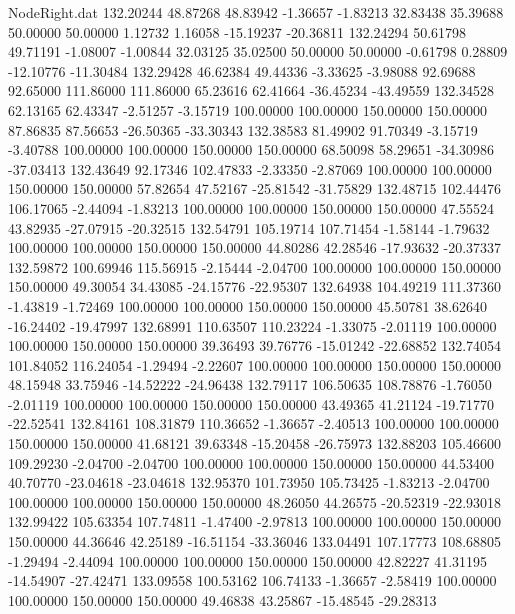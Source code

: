 \begin{filecontents}{NodeRight.dat}
 132.20244   48.87268   48.83942    -1.36657   -1.83213   32.83438   35.39688   50.00000   50.00000    1.12732    1.16058  -15.19237  -20.36811
 132.24294   50.61798   49.71191    -1.08007   -1.00844   32.03125   35.02500   50.00000   50.00000   -0.61798    0.28809  -12.10776  -11.30484
 132.29428   46.62384   49.44336    -3.33625   -3.98088   92.69688   92.65000  111.86000  111.86000   65.23616   62.41664  -36.45234  -43.49559
 132.34528   62.13165   62.43347    -2.51257   -3.15719  100.00000  100.00000  150.00000  150.00000   87.86835   87.56653  -26.50365  -33.30343
 132.38583   81.49902   91.70349    -3.15719   -3.40788  100.00000  100.00000  150.00000  150.00000   68.50098   58.29651  -34.30986  -37.03413
 132.43649   92.17346  102.47833    -2.33350   -2.87069  100.00000  100.00000  150.00000  150.00000   57.82654   47.52167  -25.81542  -31.75829
 132.48715  102.44476  106.17065    -2.44094   -1.83213  100.00000  100.00000  150.00000  150.00000   47.55524   43.82935  -27.07915  -20.32515
 132.54791  105.19714  107.71454    -1.58144   -1.79632  100.00000  100.00000  150.00000  150.00000   44.80286   42.28546  -17.93632  -20.37337
 132.59872  100.69946  115.56915    -2.15444   -2.04700  100.00000  100.00000  150.00000  150.00000   49.30054   34.43085  -24.15776  -22.95307
 132.64938  104.49219  111.37360    -1.43819   -1.72469  100.00000  100.00000  150.00000  150.00000   45.50781   38.62640  -16.24402  -19.47997
 132.68991  110.63507  110.23224    -1.33075   -2.01119  100.00000  100.00000  150.00000  150.00000   39.36493   39.76776  -15.01242  -22.68852
 132.74054  101.84052  116.24054    -1.29494   -2.22607  100.00000  100.00000  150.00000  150.00000   48.15948   33.75946  -14.52222  -24.96438
 132.79117  106.50635  108.78876    -1.76050   -2.01119  100.00000  100.00000  150.00000  150.00000   43.49365   41.21124  -19.71770  -22.52541
 132.84161  108.31879  110.36652    -1.36657   -2.40513  100.00000  100.00000  150.00000  150.00000   41.68121   39.63348  -15.20458  -26.75973
 132.88203  105.46600  109.29230    -2.04700   -2.04700  100.00000  100.00000  150.00000  150.00000   44.53400   40.70770  -23.04618  -23.04618
 132.95370  101.73950  105.73425    -1.83213   -2.04700  100.00000  100.00000  150.00000  150.00000   48.26050   44.26575  -20.52319  -22.93018
 132.99422  105.63354  107.74811    -1.47400   -2.97813  100.00000  100.00000  150.00000  150.00000   44.36646   42.25189  -16.51154  -33.36046
 133.04491  107.17773  108.68805    -1.29494   -2.44094  100.00000  100.00000  150.00000  150.00000   42.82227   41.31195  -14.54907  -27.42471
 133.09558  100.53162  106.74133    -1.36657   -2.58419  100.00000  100.00000  150.00000  150.00000   49.46838   43.25867  -15.48545  -29.28313

\end{filecontents}
